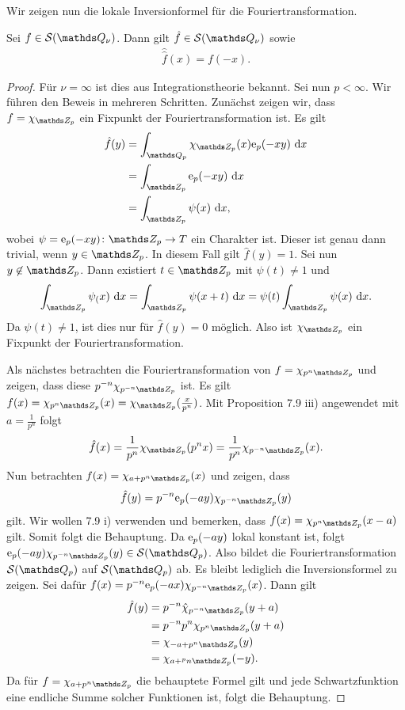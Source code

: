 Wir zeigen nun die lokale Inversionformel für die Fouriertransformation.

\begin{prop}
Sei $f \in \mathcal{S}(\Q_\nu)$. Dann gilt $\hat{f} \in \mathcal{S}(\Q_\nu)$ sowie
\begin{align*}
\hat{\hat{f}}(x)=f(-x).
\end{align*}
\end{prop}
\begin{proof}
Für $\nu=\infty$ ist dies aus Integrationstheorie bekannt.
Sei nun $p<\infty$. Wir führen den Beweis in mehreren Schritten.
Zunächst zeigen wir, dass $f=\chi_{\Z_p}$ ein Fixpunkt der Fouriertransformation ist.
Es gilt
\begin{align*}
\hat{f}(y)&=\int_{\Q_p}\chi_{\Z_p}(x)\ex_p(-xy)~\mathrm{d}x\\
&=\int_{\Z_p}  \ex_p(-xy)~\mathrm{d}x\\
&=\int_{\Z_p} \psi(x)~\mathrm{d}x,
\end{align*}
wobei $\psi =\ex_p(-xy) \colon \Z_p \to T$ ein Charakter ist.
Dieser ist genau dann trivial, wenn $y \in \Z_p$.
In diesem Fall gilt $\hat{f}(y)=1$.
Sei nun $y \not \in \Z_p$. Dann existiert $t \in \Z_p$ mit $\psi(t)\not =1$ und
\begin{align*}
\int_{\Z_p}\psi_(x)~ \mathrm{d}x=\int_{\Z_p}\psi(x+t)~\mathrm{d}x=\psi(t)\int_{\Z_p} \psi(x)~\mathrm{d}x.
\end{align*}
Da $\psi(t)\not =1$, ist dies nur für $\hat{f}(y)=0$ möglich.
Also ist $\chi_{\Z_p}$ ein Fixpunkt der Fouriertransformation.

Als nächstes betrachten die Fouriertransformation von $f=\chi_{p^n \Z_p}$ und zeigen, dass diese $p^{-n}\chi_{p^{-n} \Z_p}$ ist.
Es gilt $f(x)=\chi_{p^n \Z_p}(x)= \chi_{\Z_p}(\frac{x}{p^n})$.
Mit Proposition 7.9 iii) angewendet mit $a=\frac{1}{p^n}$ folgt
\begin{align*}
\hat{f}(x)=\frac{1}{p^n}\chi_{\Z_p}(p^nx)=\frac{1}{p^n}\chi_{p^{-n} \Z_p}(x).
\end{align*}
Nun betrachten $f(x)=\chi_{a+p^n\Z_p}(x)$ und zeigen, dass
\begin{align*}
\hat{f}(y)=p^{-n} \ex_p(-ay)\chi_{p^{-n}\Z_p}(y)
\end{align*}
gilt.
Wir wollen 7.9 i) verwenden und bemerken, dass $f(x)=\chi_{p^n\Z_p}(x-a)$ gilt.
Somit folgt die Behauptung.
Da $\mathrm{e}_p(-ay)$ lokal konstant ist, folgt $\ex_p(-ay)\chi_{p^{-n}\Z_p}(y) \in \Sq$.
Also bildet die Fouriertransformation $\Sq$ auf $\Sq$ ab.
Es bleibt lediglich die Inversionsformel zu zeigen.
Sei dafür $f(x)=p^{-n} \ex_p(-ax)\chi_{p^{-n}\Z_p}(x)$.
Dann gilt
\begin{align*}
\hat{f}(y)&=p^{-n}\hat{\chi}_{p^{-n}\Z_p} (y+a)\\
&=p^{-n}p^n \chi_{p^n \Z_p}(y+a)\\
&=\chi_{-a+p^n\Z_p}(y)\\
&=\chi_{a+^pn\Z_p}(-y).
\end{align*}
Da für $f=\chi_{a+p^n\Z_p}$ die behauptete Formel gilt und jede Schwartzfunktion eine endliche Summe solcher Funktionen ist, folgt die Behauptung.
\end{proof}

